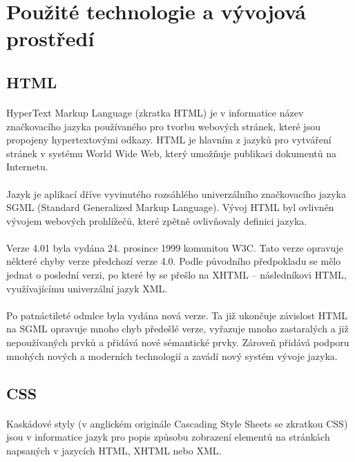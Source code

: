 \section{Použité technologie a vývojová prostředí}
\subsection{HTML}
\paragraph{}
HyperText Markup Language (zkratka HTML) je v informatice název značkovacího jazyka používaného pro tvorbu webových stránek, které jsou propojeny hypertextovými odkazy. HTML je hlavním z jazyků pro vytváření stránek v systému World Wide Web, který umožňuje publikaci dokumentů na Internetu.
\paragraph{}
Jazyk je aplikací dříve vyvinutého rozsáhlého univerzálního značkovacího jazyka SGML (Standard Generalized Markup Language). Vývoj HTML byl ovlivněn vývojem webových prohlížečů, které zpětně ovlivňovaly definici jazyka.
\paragraph{}
Verze 4.01 byla vydána 24. prosince 1999 komunitou W3C. Tato verze opravuje některé chyby verze předchozí verze 4.0. Podle původního předpokladu se mělo jednat o poslední verzi, po které by se přešlo na XHTML – následníkovi HTML, využívajícímu univerzální jazyk XML.
\paragraph{}
Po patnáctileté odmlce byla vydána nová verze. Ta již ukončuje závislost HTML na SGML opravuje mnoho chyb předešlé verze, vyřazuje mnoho zastaralých a již nepoužívaných prvků a přidává nové sémantické prvky. Zároveň přidává podporu mnohých nových a moderních technologií a zavádí nový systém vývoje jazyka.




\subsection{CSS}
\paragraph{}
Kaskádové styly (v anglickém originále Cascading Style Sheets se zkratkou CSS) jsou v informatice jazyk pro popis způsobu zobrazení elementů na stránkách napsaných v jazycích HTML, XHTML nebo XML.
